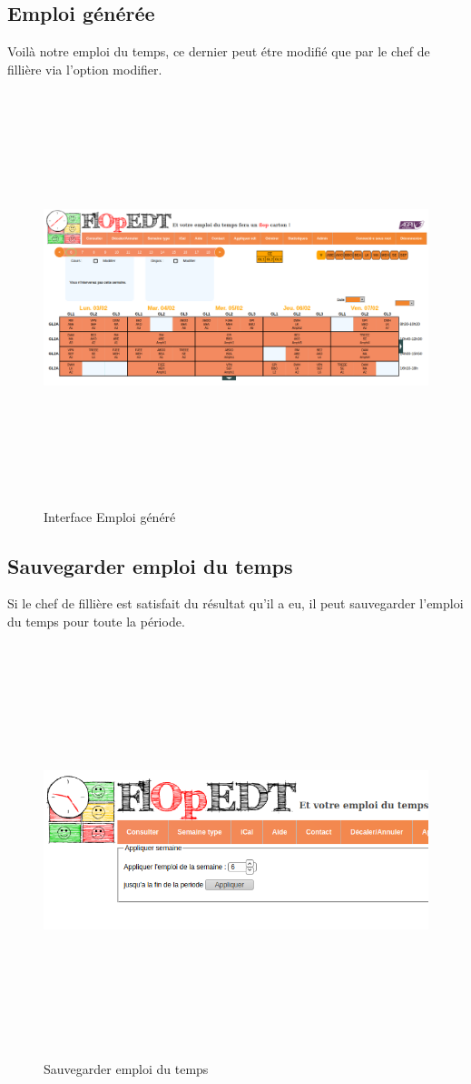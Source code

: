 \subsection*{Emploi générée}
Voilà notre emploi du temps, ce dernier peut étre modifié que par le chef de fillière via l'option modifier.
\begin{figure}[H]
      \centering
        \includegraphics[width=15cm,height=12cm]{img/5.png}
        \caption{Interface Emploi généré}
\end{figure}
\newpage
\subsection*{Sauvegarder emploi du temps}
Si le chef de fillière est satisfait du résultat qu'il a eu, il peut sauvegarder l'emploi du temps pour toute la période.
\begin{figure}[H]
      \centering
        \includegraphics[width=15cm,height=12cm]{img/6.png}
        \caption{Sauvegarder emploi du temps}
\end{figure}
\newpage

